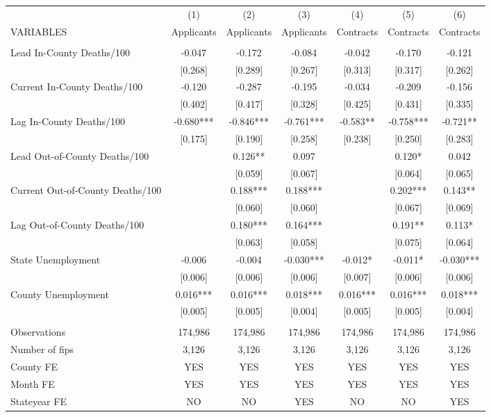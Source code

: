 \documentclass[]{article}
\begin{document}
\begin{tabular}{lcccccc} \hline
 & (1) & (2) & (3) & (4) & (5) & (6) \\
VARIABLES & Applicants & Applicants & Applicants & Contracts & Contracts & Contracts \\ \hline
 &  &  &  &  &  &  \\
Lead In-County Deaths/100 & -0.047 & -0.172 & -0.084 & -0.042 & -0.170 & -0.121 \\
 & [0.268] & [0.289] & [0.267] & [0.313] & [0.317] & [0.262] \\
Current In-County Deaths/100 & -0.120 & -0.287 & -0.195 & -0.034 & -0.209 & -0.156 \\
 & [0.402] & [0.417] & [0.328] & [0.425] & [0.431] & [0.335] \\
Lag In-County Deaths/100 & -0.680*** & -0.846*** & -0.761*** & -0.583** & -0.758*** & -0.721** \\
 & [0.175] & [0.190] & [0.258] & [0.238] & [0.250] & [0.283] \\
Lead Out-of-County Deaths/100 &  & 0.126** & 0.097 &  & 0.120* & 0.042 \\
 &  & [0.059] & [0.067] &  & [0.064] & [0.065] \\
Current Out-of-County Deaths/100 &  & 0.188*** & 0.188*** &  & 0.202*** & 0.143** \\
 &  & [0.060] & [0.060] &  & [0.067] & [0.069] \\
Lag Out-of-County Deaths/100 &  & 0.180*** & 0.164*** &  & 0.191** & 0.113* \\
 &  & [0.063] & [0.058] &  & [0.075] & [0.064] \\
State Unemployment & -0.006 & -0.004 & -0.030*** & -0.012* & -0.011* & -0.030*** \\
 & [0.006] & [0.006] & [0.006] & [0.007] & [0.006] & [0.006] \\
County Unemployment & 0.016*** & 0.016*** & 0.018*** & 0.016*** & 0.016*** & 0.018*** \\
 & [0.005] & [0.005] & [0.004] & [0.005] & [0.005] & [0.004] \\
 &  &  &  &  &  &  \\
Observations & 174,986 & 174,986 & 174,986 & 174,986 & 174,986 & 174,986 \\
Number of fips & 3,126 & 3,126 & 3,126 & 3,126 & 3,126 & 3,126 \\
County FE & YES & YES & YES & YES & YES & YES \\
Month FE & YES & YES & YES & YES & YES & YES \\
Stateyear FE & NO & NO & YES & NO & NO & YES \\

\end{tabular}
\end{document}
